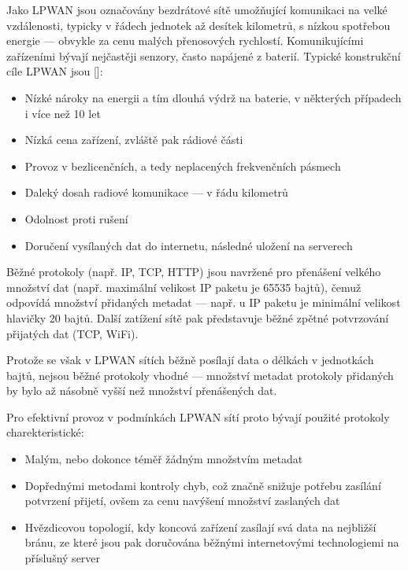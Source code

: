 
Jako LPWAN jsou označovány bezdrátové sítě umožňující komunikaci na velké
vzdálenosti, typicky v řádech jednotek až desítek kilometrů, s nízkou spotřebou
energie --- obvykle za cenu malých přenosových rychlostí.
Komunikujícími zařízeními bývají nejčastěji senzory, často napájené z baterií.
Typické konstrukční cíle LPWAN jsou []:

\begin{itemize}
    \item Nízké nároky na energii a tím dlouhá výdrž na baterie, v některých
    případech i více než 10 let
    \item Nízká cena zařízení, zvláště pak rádiové části
    \item Provoz v bezlicenčních, a tedy neplacených frekvenčních pásmech
    \item Daleký dosah radiové  komunikace --- v řádu kilometrů
    \item Odolnost proti rušení
    \item Doručení vysílaných dat do internetu, následné uložení na serverech
\end{itemize}


Běžné protokoly (např. IP, TCP, HTTP) jsou navržené pro přenášení velkého 
množství dat (např. maximální velikost IP paketu je 65535 bajtů), čemuž odpovídá
množství přidaných metadat --- např. u IP paketu je minimální velikost hlavičky
20 bajtů. Další zatížení sítě pak představuje běžné zpětné potvrzování přijatých
dat (TCP, WiFi).

Protože se však v LPWAN sítích běžně posílají data o délkách v jednotkách bajtů,
nejsou běžné protokoly vhodné --- množství metadat protokoly přidaných by 
bylo až násobně vyšší než množství přenášených dat.

Pro efektivní provoz v podmínkách LPWAN sítí proto bývají použité protokoly
charekteristické:

\begin{itemize}
    \item Malým, nebo dokonce téměř žádným množstvím metadat
    \item Dopřednými metodami kontroly chyb, což značně snižuje potřebu zasílání
        potvrzení přijetí, ovšem za cenu navýšení množství zaslaných dat
    \item Hvězdicovou topologií, kdy koncová zařízení zasílají svá data na 
        nejbližší bránu, ze které jsou pak doručována běžnými internetovými
        technologiemi na příslušný server
\end{itemize}


